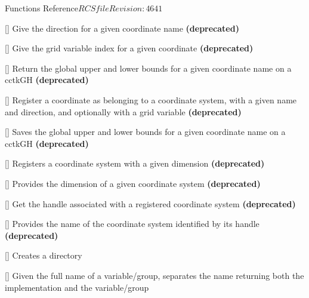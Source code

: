 \begin{cactuspart}{ Functions Reference}{$RCSfile$}{$Revision: 4641 $}
\begin{Lentry}
\item[\code{CCTK\_CoordDir}] [\pageref{CCTK-CoordDir}]
  Give the direction for a given coordinate name \textbf{(deprecated)}

\item[\code{CCTK\_CoordIndex}] [\pageref{CCTK-CoordIndex}]
  Give the grid variable index for a given coordinate \textbf{(deprecated)}

\item[\code{CCTK\_CoordRange}] [\pageref{CCTK-CoordRange}]
  Return the global upper and lower bounds for a given coordinate name
  on a cctkGH \textbf{(deprecated)}

\item[\code{CCTK\_CoordRegisterData}] [\pageref{CCTK-CoordRegisterData}]
  Register a coordinate as belonging to a coordinate system,
  with a given name and direction, and optionally with a grid variable
  \textbf{(deprecated)}

\item[\code{CCTK\_CoordRegisterRange}] [\pageref{CCTK-CoordRegisterRange}]
  Saves the global upper and lower bounds for a given coordinate name
  on a cctkGH \textbf{(deprecated)}

\item[\code{CCTK\_CoordRegisterSystem}] [\pageref{CCTK-CoordRegisterSystem}]
  Registers a coordinate system with a given dimension \textbf{(deprecated)}

\item[\code{CCTK\_CoordSystemDim}] [\pageref{CCTK-CoordDim}]
  Provides the dimension of a given coordinate system \textbf{(deprecated)}

\item[\code{CCTK\_CoordSystemHandle}] [\pageref{CCTK-CoordSystemHandle}]
  Get the handle associated with a registered coordinate system
  \textbf{(deprecated)}

\item[\code{CCTK\_CoordSystemName}] [\pageref{CCTK-CoordSystemName}]
  Provides the name of the coordinate system identified by its handle
  \textbf{(deprecated)}

\item[\code{CCTK\_CreateDirectory}] [\pageref{CCTK-CreateDirectory}]
  Creates a directory

\item[\code{CCTK\_DecomposeName}] [\pageref{CCTK-DecomposeName}]
  Given the full name of a variable/group, separates the name
  returning both the implementation and the variable/group


\end{Lentry}
\end{cactuspart}
